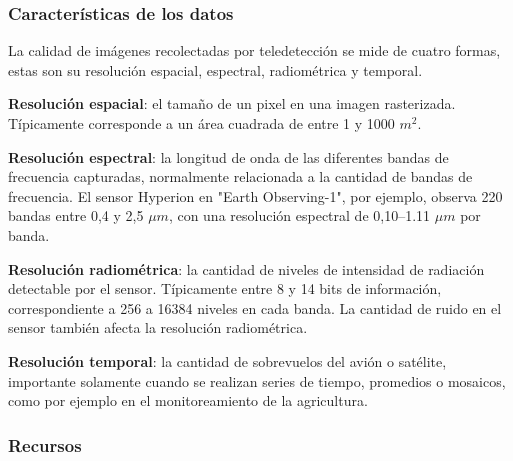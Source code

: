 \subsubsection{Características de los datos}

La calidad de imágenes recolectadas por teledetección se mide de cuatro formas, estas son su resolución espacial,
espectral, radiométrica y temporal.

{\bf Resolución espacial}: el tamaño de un pixel en una imagen rasterizada. Típicamente corresponde a un área cuadrada
de entre 1 y 1000 $m^2$.

{\bf Resolución espectral}: la longitud de onda de las diferentes bandas de frecuencia capturadas, normalmente
relacionada a la cantidad de bandas de frecuencia. El sensor Hyperion en "Earth Observing-1", por ejemplo, observa 220
bandas entre 0,4 y 2,5 $\mu m$, con una resolución espectral de 0,10--1.11 $\mu m$ por banda.
\autocite{earth-observatory-earth-observing-1}

{\bf Resolución radiométrica}: la cantidad de niveles de intensidad de radiación detectable por el sensor. Típicamente
entre 8 y 14 bits de información, correspondiente a 256 a 16384 niveles en cada banda. La cantidad de ruido en el
sensor también afecta la resolución radiométrica.

{\bf Resolución temporal}: la cantidad de sobrevuelos del avión o satélite, importante solamente cuando se realizan
series de tiempo, promedios o mosaicos, como por ejemplo en el monitoreamiento de la agricultura.

\subsubsection{Recursos}
